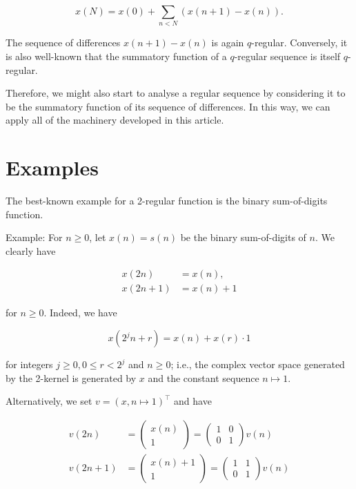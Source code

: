 $$
x(N)=x(0)+\sum_{n<N}(x(n+1)-x(n)) .
$$

The sequence of differences $x(n+1)-x(n)$ is again $q$-regular. Conversely, it is also well-known that the summatory function of a $q$-regular sequence is itself $q$-regular.

Therefore, we might also start to analyse a regular sequence by considering it to be the summatory function of its sequence of differences. In this way, we can apply all of the machinery developed in this article.
 
 

\section{Examples}

The best-known example for a 2-regular function is the binary sum-of-digits function.

Example: For $n \geq 0$, let $x(n)=s(n)$ be the binary sum-of-digits of $n$. We clearly have

$$
\begin{aligned}
	x(2 n) & =x(n), \\
	x(2 n+1) & =x(n)+1
\end{aligned}
$$

for $n \geq 0$. Indeed, we have

$$
x\left(2^{j} n+r\right)=x(n)+x(r) \cdot 1
$$

for integers $j \geq 0,0 \leq r<2^{j}$ and $n \geq 0$; i.e., the complex vector space generated by the 2-kernel is generated by $x$ and the constant sequence $n \mapsto 1$.

Alternatively, we set $v=(x, n \mapsto 1)^{\top}$ and have

$$
\begin{aligned}
	v(2 n) & =\left(\begin{array}{c}
		x(n) \\
		1
	\end{array}\right)=\left(\begin{array}{ll}
		1 & 0 \\
		0 & 1
	\end{array}\right) v(n) \\
	v(2 n+1) & =\left(\begin{array}{c}
		x(n)+1 \\
		1
	\end{array}\right)=\left(\begin{array}{ll}
		1 & 1 \\
		0 & 1
	\end{array}\right) v(n)
\end{aligned}
$$

